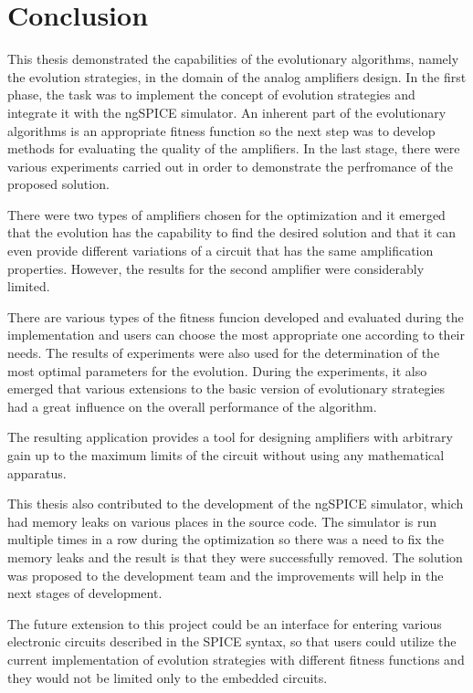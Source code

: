 \chapter{Conclusion}
This thesis demonstrated the capabilities of the evolutionary algorithms, namely the evolution strategies, in the domain of the analog amplifiers design. In the first phase, the task was to implement the concept of evolution strategies and integrate it with the ngSPICE simulator. An inherent part of the evolutionary algorithms is an appropriate fitness function so the next step was to develop methods for evaluating the quality of the amplifiers. In the last stage, there were various experiments carried out in order to demonstrate the perfromance of the proposed solution.

There were two types of amplifiers chosen for the optimization and it emerged that the evolution has the capability to find the desired solution and that it can even provide different variations of a circuit that has the same amplification properties. However, the results for the second amplifier were considerably limited.

There are various types of the fitness funcion developed and evaluated during the implementation and users can choose the most appropriate one according to their needs. The results of experiments were also used for the determination of the most optimal parameters for the evolution. During the experiments, it also emerged that various extensions to the basic version of evolutionary strategies had a great influence on the overall performance of the algorithm.

The resulting application provides a tool for designing amplifiers with arbitrary gain up to the maximum limits of the circuit without using any mathematical apparatus.

This thesis also contributed to the development of the ngSPICE simulator, which had memory leaks on various places in the source code. The simulator is run multiple times in a row during the optimization so there was a need to fix the memory leaks and the result is that they were successfully removed. The solution was proposed to the development team and the improvements will help in the next stages of development.

The future extension to this project could be an interface for entering various electronic circuits described in the SPICE syntax, so that users could utilize the current implementation of evolution strategies with different fitness functions and they would not be limited only to the embedded circuits.